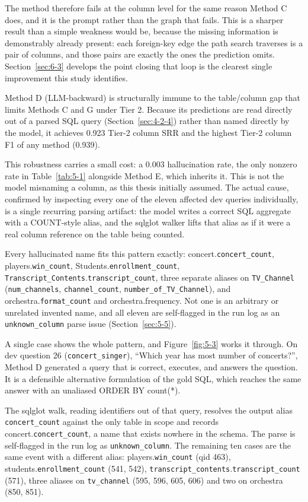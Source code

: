 The method therefore fails at the column level for the same reason Method C does, and it is the prompt rather than the graph that fails. This is a sharper result than a simple weakness would be, because the missing information is demonstrably already present: each foreign-key edge the path search traverses is a pair of columns, and those pairs are exactly the ones the prediction omits. Section~\ref{sec:6-3} develops the point closing that loop is the clearest single improvement this study identifies.

Method D (LLM-backward) is structurally immune to the table/column gap that limits Methods C and G under Tier 2. Because its predictions are read directly out of a parsed SQL query (Section~\ref{sec:4-2-4}) rather than named directly by the model, it achieves 0.923 Tier-2 column SRR and the highest Tier-2 column F1 of any method (0.939).

This robustness carries a small cost: a 0.003 hallucination rate, the only nonzero rate in Table~\ref{tab:5-1} alongside Method E, which inherits it. This is not the model misnaming a column, as this thesis initially assumed. The actual cause, confirmed by inspecting every one of the eleven affected dev queries individually, is a single recurring parsing artifact: the model writes a correct SQL aggregate with a COUNT-style alias, and the sqlglot walker lifts that alias as if it were a real column reference on the table being counted.

Every hallucinated name fits this pattern exactly: concert.\texttt{concert\_count}, players.\texttt{win\_count}, Students.\texttt{enrollment\_count}, \texttt{Transcript\_Contents}.\texttt{transcript\_count}, three separate aliases on \texttt{TV\_Channel} (\texttt{num\_channels}, \texttt{channel\_count}, \texttt{number\_of\_TV\_Channel}), and orchestra.\texttt{format\_count} and orchestra.frequency. Not one is an arbitrary or unrelated invented name, and all eleven are self-flagged in the run log as an \texttt{unknown\_column} parse issue (Section~\ref{sec:5-5}).

A single case shows the whole pattern, and Figure~\ref{fig:5-3} works it through. On dev question 26 (\texttt{concert\_singer}), ``Which year has most number of concerts?'', Method D generated a query that is correct, executes, and answers the question. It is a defensible alternative formulation of the gold SQL, which reaches the same answer with an unaliased ORDER BY count(*).

The sqlglot walk, reading identifiers out of that query, resolves the output alias \texttt{concert\_count} against the only table in scope and records concert.\texttt{concert\_count}, a name that exists nowhere in the schema. The parse is self-flagged in the run log as \texttt{unknown\_column}. The remaining ten cases are the same event with a different alias: players.\texttt{win\_count} (qid 463), students.\texttt{enrollment\_count} (541, 542), \texttt{transcript\_contents}.\texttt{transcript\_count} (571), three aliases on \texttt{tv\_channel} (595, 596, 605, 606) and two on orchestra (850, 851).

